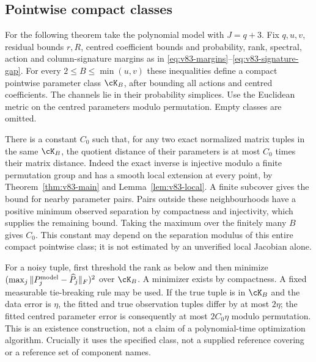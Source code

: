 \subsection{Pointwise compact classes}
For the following theorem take the polynomial model with $J=q+3$.
Fix $q,u,v$, residual bounds $r,R$, centred coefficient bounds and
probability, rank, spectral, action and column-signature margins as in
\eqref{eq:v83-margins}--\eqref{eq:v83-signature-gap}. For every
$2\le B\le\min(u,v)$ these inequalities define a compact pointwise
parameter class $\cK_B$, after bounding all actions and centred
coefficients. The channels lie in their probability simplices. Use
the Euclidean metric on the centred parameters modulo permutation.
Empty classes are omitted.

There is a constant $C_0$ such that, for any two exact normalized
matrix tuples in the same $\cK_B$, the quotient distance of their
parameters is at most $C_0$ times their matrix distance. Indeed the
exact inverse is injective modulo a finite permutation group and has
a smooth local extension at every point, by
Theorem~\ref{thm:v83-main} and Lemma~\ref{lem:v83-local}. A finite
subcover gives the bound for nearby parameter pairs. Pairs outside
these neighbourhoods have a positive minimum observed separation by
compactness and injectivity, which supplies the remaining bound.
Taking the maximum over the finitely many $B$ gives $C_0$.
This constant may depend on the separation modulus of this entire
compact pointwise class; it is not estimated by an unverified local
Jacobian alone.

For a noisy tuple, first threshold the rank as below and then minimize
$(\max_j\|P_j^{\rm model}-\widehat P_j\|_F)^2$ over $\cK_B$. A minimizer exists by
compactness. A fixed measurable tie-breaking rule may be used. If the
true tuple is in $\cK_B$ and the data error is $\eta$, the fitted and
true observation tuples differ by at most $2\eta$; the fitted centred
parameter error is consequently at most $2C_0\eta$ modulo permutation.
This is an existence construction, not a claim of a polynomial-time
optimization algorithm. Crucially it uses the specified class, not
a supplied reference covering or a reference set of component names.

